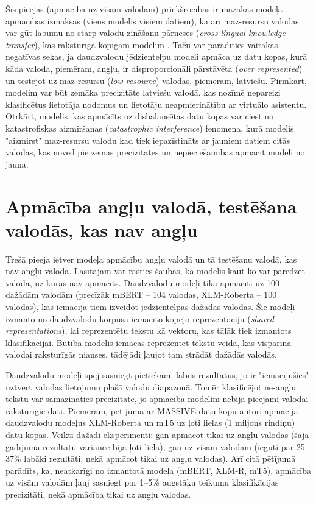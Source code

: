 Šīs pieejas (apmācība uz visām valodām) priekšrocības ir mazākas modeļa apmācības izmaksas (viens modelis visiem datiem), kā arī maz-resursu valodas var gūt labumu no starp-valodu zināšanu pārneses (\textit{cross-lingual knowledge transfer}), kas raksturīga kopīgam modelim \cite{de-bruyn-2022}. Taču var parādīties vairākas negatīvas sekas, ja daudzvalodu jēdzientelpu modeli apmāca uz datu kopas, kurā kāda valoda, piemēram, angļu, ir disproporcionāli pārstāvēta (\textit{over represented}) un testējot uz maz-resursu (\textit{low-resource}) valodas, piemēram, latviešu. Pirmkārt, modelim var būt zemāka precizitāte latviešu valodā, kas nozīmē nepareizi klasificētus lietotāja nodomus un lietotāju neapmierinātību ar virtuālo asistentu. Otrkārt, modelis, kas apmācīts uz disbalansētas datu kopas var ciest no katastrofiskas aizmiršanas (\textit{catastrophic interference}) fenomena, kurā modelis "aizmirst" maz-resursu valodu kad tiek iepazīstināts ar jauniem datiem citās valodās, kas noved pie zemas precizitātes un nepieciešamības apmācīt modeli no jauna.


\section{Apmācība angļu valodā, testēšana valodās, kas nav angļu}

Trešā pieeja ietver modeļa apmācību angļu valodā un tā testēšanu valodā, kas nav angļu valoda. Lasītājam var rasties šaubas, kā modelis kaut ko var paredzēt valodā, uz kuras nav apmācīts. Daudzvalodu modeļi tika apmācīti uz 100 dažādām valodām (precīzāk mBERT -- 104 valodas, XLM-Roberta -- 100 valodas), kas iemācīja tiem izveidot jēdzientelpas dažādās valodās. Šie modeļi izmanto no daudzvalodu korpusa iemācīto kopējo reprezentāciju (\textit{shared representations}), lai reprezentētu tekstu kā vektoru, kas tālāk tiek izmantots klasifikācijai. Būtībā modelis iemācās reprezentēt tekstu veidā, kas vispārina valodai raksturīgās nianses, tādējādi ļaujot tam strādāt dažādās valodās. 

Daudzvalodu modeļi spēj sasniegt pietiekami labus rezultātus, jo ir "iemācījušies" uztvert valodas lietojumu plašā valodu diapazonā. Tomēr klasificējot ne-angļu tekstu var samazināties precizitāte, jo apmācībā modelim nebija pieejami valodai raksturīgie dati.
Piemēram, pētījumā ar MASSIVE datu kopu \cite{fitzgerald2022} autori apmācīja daudzvalodu modeļus XLM-Roberta un mT5 uz ļoti lielas (1 miljons rindiņu) datu kopas. Veikti dažādi eksperimenti: gan apmācot tikai uz angļu valodas (šajā gadījumā rezultātu variance bija ļoti liela), gan uz visām valodām (iegūti par 25-37\% labāki rezultāti, nekā apmācot tikai uz angļu valodas).
Arī citā pētījumā \cite{xue2021} parādīts, ka, neatkarīgi no izmantotā modeļa (mBERT, XLM-R, mT5), apmācība uz visām valodām ļauj sasniegt par 1--5\% augstāku teikumu klasifikācijas precizitāti, nekā apmācība tikai uz angļu valodas. 

